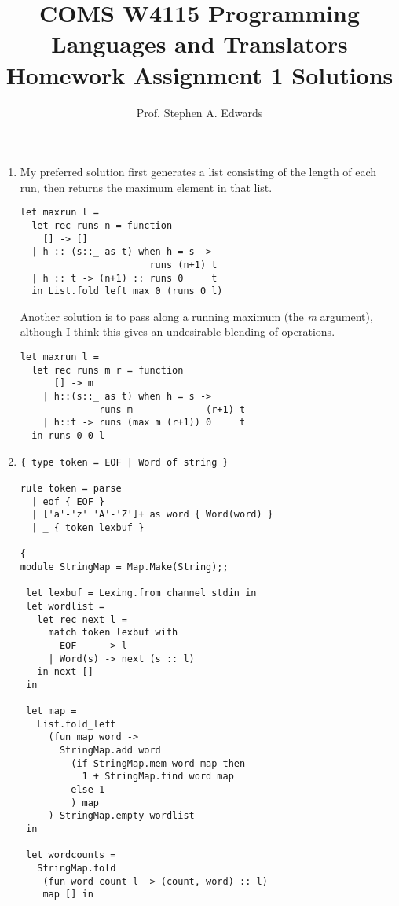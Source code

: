 \documentclass[twocolumn]{article}
\title{COMS W4115 Programming Languages and Translators \\
Homework Assignment 1 Solutions}
\author{Prof. Stephen A. Edwards}
\date{}
\begin{document}
\maketitle
\thispagestyle{empty}

\begin{enumerate}

\item

  My preferred solution first generates a list consisting of the
  length of each run, then returns the maximum element in that list.
  
\begin{lstlisting}
let maxrun l =
  let rec runs n = function
    [] -> []
  | h :: (s::_ as t) when h = s ->
                       runs (n+1) t
  | h :: t -> (n+1) :: runs 0     t
  in List.fold_left max 0 (runs 0 l)
\end{lstlisting}

Another solution is to pass along a running maximum (the \textit{m}
argument), although I think this gives an undesirable blending of
operations.

\begin{lstlisting}
let maxrun l =
  let rec runs m r = function
      [] -> m
    | h::(s::_ as t) when h = s ->
              runs m             (r+1) t
    | h::t -> runs (max m (r+1)) 0     t
  in runs 0 0 l
\end{lstlisting}


\newpage
\item

\begin{lstlisting}[morekeywords={rule,parse,eof}]
{ type token = EOF | Word of string }

rule token = parse
  | eof { EOF }
  | ['a'-'z' 'A'-'Z']+ as word { Word(word) }
  | _ { token lexbuf }

{
module StringMap = Map.Make(String);;

 let lexbuf = Lexing.from_channel stdin in
 let wordlist = 
   let rec next l =
     match token lexbuf with
       EOF     -> l
     | Word(s) -> next (s :: l)
   in next []
 in
 
 let map =
   List.fold_left
     (fun map word ->
       StringMap.add word
         (if StringMap.mem word map then
           1 + StringMap.find word map
         else 1
         ) map
     ) StringMap.empty wordlist
 in

 let wordcounts =
   StringMap.fold
    (fun word count l -> (count, word) :: l)
    map [] in


\end{lstlisting}
\end{enumerate}
\end{document}
